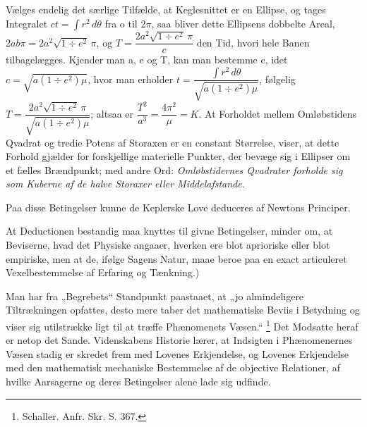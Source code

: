 \documentclass[12pt,a4paper]{book}
\begin{document}
{Vælges endelig det særlige Tilfælde, at Keglesnittet er en Ellipse,
og tages Integralet $ct = \int r^{2}\, d\theta $ fra o til $2\pi $, saa bliver
dette Ellipsens dobbelte Areal,
$2 ab\pi = 2a^{2} \sqrt{1 \div e^{2}}\, \pi $, og
$T = \dfrac{2 a^{2} \sqrt{1 \div e^{2}}\, \pi}{c}$ den Tid, hvori hele
Banen tilbagelægges. Kjender man a, e og T, kan man bestemme c, idet
$c = \sqrt{a (1 \div e^{2}) \mu}$, hvor man erholder
$t = \dfrac{\int r^{2}\, d\theta}{\sqrt{a (1 \div e^{2}) \mu}}$, følgelig
$T = \dfrac{2 a^{2} \sqrt{1 \div e^{2}}\, \pi}{\sqrt{a (1 \div e^{2}) \mu}}$;
altsaa er $\dfrac{T^{2}}{a^{3}} = \dfrac{4\pi^{2}}{\mu} = K$.
At Forholdet mellem Omløbstidens Qvadrat og tredie Potens af Storaxen
er en constant Størrelse, viser, at dette Forhold gjælder for
forskjellige materielle Punkter, der bevæge sig i Ellipser om et
fælles Brændpunkt; med andre Ord: \emph{Omløbstidernes Qvadrater
forholde sig som Kuberne af de halve Storaxer eller
Middelafstande.}

Paa disse Betingelser kunne de Keplerske Love deduceres af Newtons
Principer.}
At Deductionen bestandig maa knyttes til
givne Betingelser, minder om, at Beviserne, hvad det Physiske
angaaer, hverken ere blot aprioriske eller blot empiriske, men at
de, ifølge Sagens Natur, maae beroe paa en exact articuleret
Vexelbestemmelse af Erfaring og Tænkning.)

Man har fra „Begrebets“ Standpunkt paastaaet, at „jo almindeligere
Tiltrækningen opfattes, desto mere taber det mathematiske Beviis i
Betydning og viser sig utilstrække\-%
ligt til at træffe Phænomenets Væsen.“%
\footnote{%
Schaller. Anfr. Skr. S. 367.}
Det Modsatte heraf er netop det Sande. Videnskabens Historie lærer,
at Indsigten i Phænomenernes Væsen stadig er skredet frem med
Lovenes Erkjendelse, og Lovenes Erkjendelse med den mathematisk
mechaniske Bestemmelse af de objective Relationer, af hvilke
Aarsagerne og deres Betingelser alene lade sig udfinde.
\end{document}
